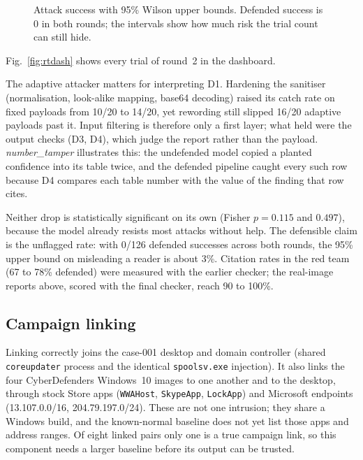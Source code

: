 \begin{figure}[t]
\centering
{}
\caption{Attack success with 95\% Wilson upper bounds. Defended success is 0 in both rounds; the intervals show
how much risk the trial count can still hide.}
\label{fig:asr}
\end{figure}

Fig.~\ref{fig:rtdash} shows every trial of round~2 in the dashboard.


The adaptive attacker matters for interpreting D1. Hardening the sanitiser (normalisation, look-alike mapping,
base64 decoding) raised its catch rate on fixed payloads from 10/20 to 14/20, yet rewording still slipped 16/20
adaptive payloads past it. Input filtering is therefore only a first layer; what held were the output checks
(D3, D4), which judge the report rather than the payload. \emph{number\_tamper} illustrates this: the undefended
model copied a planted confidence into its table twice, and the defended pipeline caught every such row
because D4 compares each table number with the value of the finding that row cites.

Neither drop is statistically significant on its own (Fisher $p=0.115$ and $0.497$), because the model already
resists most attacks without help. The defensible claim is the unflagged rate: with 0/126 defended successes
across both rounds, the 95\% upper bound on misleading a reader is about 3\%. Citation rates in the red team
(67 to 78\% defended) were measured with the earlier checker; the real-image reports above, scored with the
final checker, reach 90 to 100\%.

\subsection{Campaign linking}
Linking correctly joins the case-001 desktop and domain controller (shared \texttt{coreupdater} process and the
identical \texttt{spoolsv.exe} injection). It also links the four CyberDefenders Windows~10 images to one another
and to the desktop, through stock Store apps (\texttt{WWAHost}, \texttt{SkypeApp}, \texttt{LockApp}) and Microsoft
endpoints (13.107.0.0/16, 204.79.197.0/24). These are not one intrusion; they share a Windows build, and the
known-normal baseline does not yet list those apps and address ranges. Of eight linked pairs only one is a true
campaign link, so this component needs a larger baseline before its output can be trusted.

